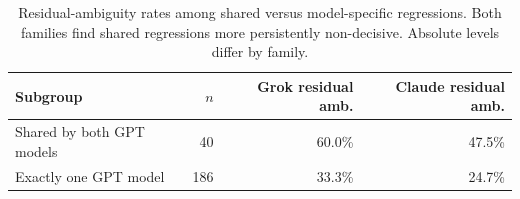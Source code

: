 \begin{table}[t]
\centering
\caption{Residual-ambiguity rates among shared versus model-specific regressions. Both families find shared regressions more persistently non-decisive. Absolute levels differ by family.}
\label{tab:shared}
\begin{tabular}{lrrr}
\toprule
Subgroup & $n$ & Grok residual amb. & Claude residual amb. \\
\midrule
Shared by both GPT models & 40 & 60.0\% & 47.5\% \\
Exactly one GPT model & 186 & 33.3\% & 24.7\% \\
\bottomrule
\end{tabular}
\end{table}
